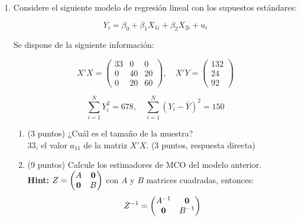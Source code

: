 \documentclass[10pt,a4paper]{article}
\begin{document}
\begin{enumerate}
\begin{enumerate}
\color{blue}
Teorema: Bajo los supuestos 1 a 4, el estimador MCO de $\beta$ es insesgado.
Demostración:
    \begin{align*}
        \hat{\beta} &= (X^{\top}X)^{-1}X^{\top}y \quad \text{(3)} \\
        &= (X^{\top}X)^{-1}X^{\top}(X\beta + u) \quad \text{(4)} \\
        &= \beta + (X^{\top}X)^{-1}X^{\top}u \quad \text{(5)} \\
        E(\hat{\beta}|X) &= \beta + (X^{\top}X)^{-1}X^{\top}E(u|X) \quad \text{(6)} \\
        &= \beta \quad \text{(7)}
    \end{align*}
(5 puntos)
Esto implica que el promedio de los estimadores $\hat{\beta}$ obtenidos con todas las muestras aleatorias posibles es igual a $\beta$.

    
\end{enumerate}

\vspace{0.5cm}

    \item Considere el siguiente modelo de regresión lineal con los supuestos estándares:

    \[
    Y_i = \beta_0 + \beta_1 X_{1i} + \beta_2 X_{2i} + u_i
    \]
    
    Se dispone de la siguiente información:
    
    \[
    X'X = \begin{pmatrix}
    33 & 0 & 0 \\
    0 & 40 & 20 \\
    0 & 20 & 60
    \end{pmatrix}, \quad
    X'Y = \begin{pmatrix}
    132 \\
    24 \\
    92
    \end{pmatrix}
    \]
    
    \[
    \sum_{i=1}^{N} Y_i^2 = 678, \quad \sum_{i=1}^{N} (Y_i - \bar{Y})^2 = 150
    \]

    \begin{enumerate}
        \item (3 puntos) ¿Cuál es el tamaño de la muestra?\\

        {\color{blue} 33, el valor $a_{11}$ de la matriz $X'X$.} (3 puntos, respuesta directa)\\
        
        \item (9 puntos) Calcule los estimadores de MCO del modelo anterior.\\
        \textbf{Hint:} \( Z = \begin{pmatrix} A &{\bf 0} \\ {\bf 0} & B \end{pmatrix} \) con \( A \) y \( B \) matrices cuadradas, entonces:\[Z^{-1} = \begin{pmatrix} A^{-1} & {\bf 0} \\{\bf 0} & B^{-1} \end{pmatrix}\]


\end{enumerate}
\end{enumerate}
\end{document}
